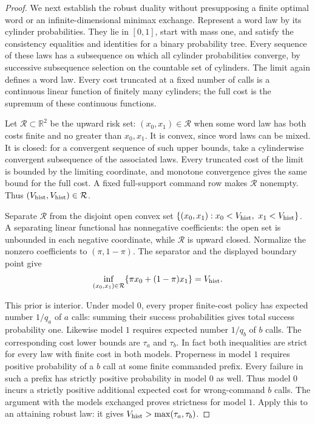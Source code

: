 \begin{proof}
We next establish the robust duality without presupposing a
finite optimal word or an infinite-dimensional minimax exchange.
Represent a word law by its cylinder probabilities.  They lie
in $[0,1]$, start with mass one, and satisfy the consistency
equalities and identities for a binary probability tree.  Every
sequence of these laws has a subsequence on which all cylinder
probabilities converge, by successive subsequence selection on
the countable set of cylinders.  The limit again defines a word
law.  Every cost truncated at a fixed number of calls is a
continuous linear function of finitely many cylinders; the full
cost is the supremum of these continuous functions.

Let $\mathcal R\subset\mathbb R^2$ be the upward risk set:
$(x_0,x_1)\in\mathcal R$ when some word law has both costs finite
and no greater than $x_0,x_1$.  It is convex, since word laws can
be mixed.  It is closed: for a convergent sequence of such upper
bounds, take a cylinderwise convergent subsequence of the
associated laws.  Every truncated cost of the limit is bounded
by the limiting coordinate, and monotone convergence gives the
same bound for the full cost.  A fixed full-support command row
makes $\mathcal R$ nonempty.  Thus
$(V_{\rm hist},V_{\rm hist})\in\mathcal R$.

Separate $\mathcal R$ from the disjoint open convex set
$\{(x_0,x_1):x_0<V_{\rm hist},\ x_1<V_{\rm hist}\}$.
A separating linear functional has nonnegative coefficients:
the open set is unbounded in each negative coordinate, while
$\mathcal R$ is upward closed.  Normalize the nonzero
coefficients to $(\pi,1-\pi)$.  The separator and the displayed
boundary point give
\begin{equation}\label{eq:r80-risk-separation}
 \inf_{(x_0,x_1)\in\mathcal R}
          \{\pi x_0+(1-\pi)x_1\}=V_{\rm hist}.
\end{equation}

This prior is interior.  Under model $0$, every proper finite-cost
policy has expected number $1/q_a$ of $a$ calls: summing their
success probabilities gives total success probability one.
Likewise model $1$ requires expected number $1/q_b$ of $b$ calls.
The corresponding cost lower bounds are $\tau_a$ and $\tau_b$.
In fact both inequalities are strict for every law with finite
cost in both models.  Properness in model $1$ requires positive
probability of a $b$ call at some finite commanded prefix.
Every failure in such a prefix has strictly positive probability
in model $0$ as well.  Thus model $0$ incurs a strictly positive
additional expected cost for wrong-command $b$ calls.  The
argument with the models exchanged proves strictness for model
$1$.  Apply this to an attaining robust law: it gives
$V_{\rm hist}>\max(\tau_a,\tau_b)$.


\end{proof}
